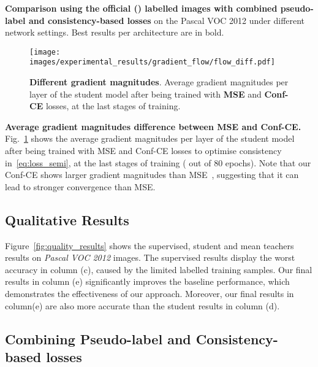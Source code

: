 \documentclass[10pt,twocolumn,letterpaper]{article}
\begin{document}
\begin{table}[h!]
\centering 
\caption{\textbf{Comparison using  the official () labelled images with combined pseudo-label and consistency-based losses} on the Pascal VOC 2012 under different network settings. Best results per architecture are in bold. }\resizebox{.95\hsize}{!}{}
\label{table:cam_exp}
\end{table}

\begin{figure}[h!]
    \centering
    \texttt{[image: images/experimental\_results/gradient\_flow/flow\_diff.pdf]}
    \caption{\textbf{Different gradient magnitudes}. Average gradient magnitudes per layer of the student model after being trained with \textbf{MSE} and \textbf{Conf-CE} losses, at the last stages of training. 
}\vspace{-8pt}
    \label{fig:gradient_diff}
\end{figure}
\textbf{Average gradient magnitudes difference between MSE and Conf-CE.} Fig.~\ref{fig:gradient_diff} shows the average gradient magnitudes per layer of the student model after being trained with MSE and Conf-CE losses to optimise consistency in~\eqref{eq:loss_semi}, at the last stages of training ( out of 80 epochs). Note that our Conf-CE shows larger gradient magnitudes than MSE~\cite{ke2020guided, chen2021semi, french2019semi}, suggesting that it can lead to stronger convergence than MSE. 


\subsection{Qualitative Results}

Figure~\ref{fig:quality_results} shows the supervised, student and mean teachers results on \textit{Pascal VOC 2012} images. The supervised results display the worst accuracy in column (c), caused by the limited labelled training samples. Our final results in column (e) significantly improves the baseline performance, which demonstrates the effectiveness of our approach. Moreover, our final results in column(e) are also more accurate than the student results in column (d).





\subsection{Combining Pseudo-label and Consistency-based losses}
\label{sec:pseudo_label_consistency}
\end{document}
